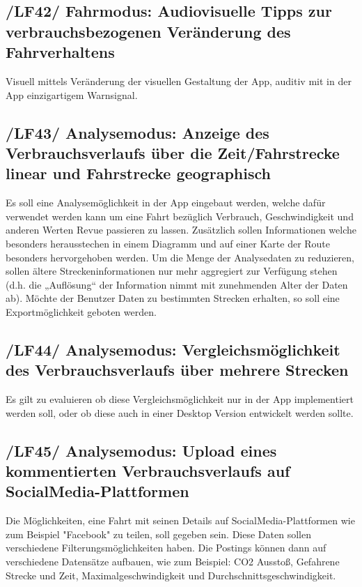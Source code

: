 \subsection{/LF42/ Fahrmodus: Audiovisuelle Tipps zur verbrauchsbezogenen Veränderung des Fahrverhaltens}
\newline
Visuell mittels Veränderung der visuellen Gestaltung der App, auditiv mit in der App einzigartigem Warnsignal.

\subsection{/LF43/ Analysemodus: Anzeige des Verbrauchsverlaufs über die Zeit/Fahrstrecke linear und Fahrstrecke geographisch}
\newline
Es soll eine Analysemöglichkeit in der App eingebaut werden, welche dafür verwendet werden kann um eine Fahrt bezüglich Verbrauch, Geschwindigkeit und anderen Werten Revue passieren zu lassen. Zusätzlich sollen Informationen welche besonders herausstechen in einem Diagramm und auf einer Karte der Route besonders hervorgehoben werden. Um die Menge der Analysedaten zu reduzieren, sollen ältere Streckeninformationen nur mehr aggregiert zur Verfügung stehen (d.h. die „Auflösung“ der Information nimmt mit zunehmenden Alter der Daten ab). Möchte der Benutzer Daten zu bestimmten Strecken erhalten, so soll eine Exportmöglichkeit geboten werden.
\subsection{/LF44/ Analysemodus: Vergleichsmöglichkeit des Verbrauchsverlaufs über mehrere Strecken}
\newline
Es gilt zu evaluieren ob diese Vergleichsmöglichkeit nur in der App implementiert werden soll, oder ob diese auch in einer Desktop Version entwickelt werden sollte. 
\subsection{/LF45/ Analysemodus: Upload eines kommentierten Verbrauchsverlaufs auf SocialMedia-Plattformen}
\newline
Die Möglichkeiten, eine Fahrt mit seinen Details auf SocialMedia-Plattformen wie zum Beispiel "Facebook" zu teilen, soll gegeben sein. Diese Daten sollen verschiedene Filterungsmöglichkeiten haben. Die Postings können dann auf verschiedene Datensätze aufbauen, wie zum Beispiel: CO2 Ausstoß, Gefahrene Strecke und Zeit, Maximalgeschwindigkeit und Durchschnittsgeschwindigkeit.

